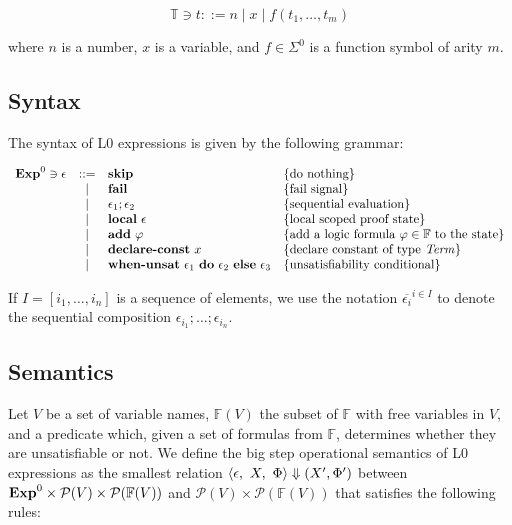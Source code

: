 \[
\mathbb{T} \ni t ::= n \mid x \mid f(t_1, \ldots, t_m)
\]

where $n$ is a number, $x$ is a variable, and $f \in \Sigma^{0}$ is a function 
symbol of arity $m$.

\subsection{Syntax}

The syntax of L0 expressions is given by the following grammar:

\[
\begin{array}{rcll}
\mathbf{Exp}^{0} \ni \epsilon & ::= & \textbf{skip} & \{ \textrm{do nothing} \}\\
& | & \textbf{fail} & \{ \textrm{fail signal} \}\\
& | & \epsilon_1;\epsilon_2 & \{ \textrm{sequential evaluation} \}\\
& | & \textbf{local}~\epsilon & \{ \textrm{local scoped proof state} \}\\
& | & \textbf{add}~\varphi &  \{ \textrm{add a logic formula $\varphi \in \mathbb{F}$ to the state} \}\\
& | & \textbf{declare-const}~x &  \{ \textrm{declare constant of type $\mathit{Term}$} \}\\
& | & \textbf{when-unsat}~\epsilon_1~\textbf{do}~\epsilon_2~\textbf{else}~\epsilon_3 &  \{ \textrm{unsatisfiability conditional} \}\\
\end{array}
\]

If $I = [i_1, \ldots, i_n]$ is a sequence of elements, we use the notation
$\overline{\epsilon_i}^{i \in I}$ to denote the sequential composition 
$\epsilon_{i_1};\dots;\epsilon_{i_n}$.

\subsection{Semantics}

Let $V$ be a set of variable names, $\mathbb{F}(V)$ the subset of $\mathbb{F}$ 
with free variables in $V$, and a predicate \unsat{\_} which, given a set of 
formulas from $\mathbb{F}$, determines whether they are unsatisfiable or not. 
We define the big step operational semantics of L0 expressions as the smallest 
relation $\langle \epsilon,~X,~\Phi\rangle \Downarrow (X', \Phi')$ between $\mathbf{Exp}^{0} \times 
\mathcal{P}(V) \times \mathcal{P}({\mathbb{F}(V)})$ and 
$\mathcal{P}(V) \times \mathcal{P}({\mathbb{F}(V)})$ that satisfies the following 
rules:

\bigskip

